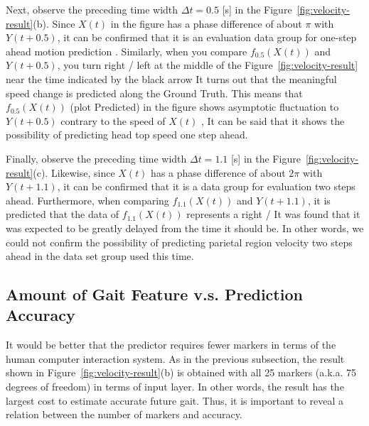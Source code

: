 \documentclass{sigchi}
\begin{document}
Next, observe the preceding time width $ \Delta t = 0.5 $ [s] in the Figure~\ref{fig:velocity-result}(b). Since $ X (t) $ in the figure has a phase difference of about $ \pi $ with $ Y (t + 0.5) $, it can be confirmed that it is an evaluation data group for one-step ahead motion prediction . Similarly, when you compare $ f_ {0.5} (X (t)) $ and $ Y (t + 0.5) $, you turn right / left at the middle of the Figure~\ref{fig:velocity-result} near the time indicated by the black arrow It turns out that the meaningful speed change is predicted along the Ground Truth. This means that $ f_ {0.5} (X (t)) $ (plot Predicted) in the figure shows asymptotic fluctuation to $ Y (t + 0.5) $ contrary to the speed of $ X (t) $ , It can be said that it shows the possibility of predicting head top speed one step ahead.

Finally, observe the preceding time width $ \Delta t = 1.1 $ [s] in the Figure~\ref{fig:velocity-result}(c). Likewise, since $ X (t) $ has a phase difference of about $ 2 \pi $ with $ Y (t + 1.1) $, it can be confirmed that it is a data group for evaluation two steps ahead. Furthermore, when comparing $ f_ {1.1} (X (t)) $ and $ Y (t + 1.1) $, it is predicted that the data of $ f_ {1.1} (X (t)) $ represents a right / It was found that it was expected to be greatly delayed from the time it should be. In other words, we could not confirm the possibility of predicting parietal region velocity two steps ahead in the data set group used this time.


\subsection{Amount of Gait Feature v.s. Prediction Accuracy}
It would be better that the predictor requires fewer markers in terms of the human computer interaction system. As in the previous subsection, the result shown in Figure~\ref{fig:velocity-result}(b) is obtained with all 25 markers (a.k.a. 75 degrees of freedom) in terms of input layer. In other words, the result has the largest cost to estimate accurate future gait. Thus, it is important to reveal a relation between the number of markers and accuracy. 
\end{document}
